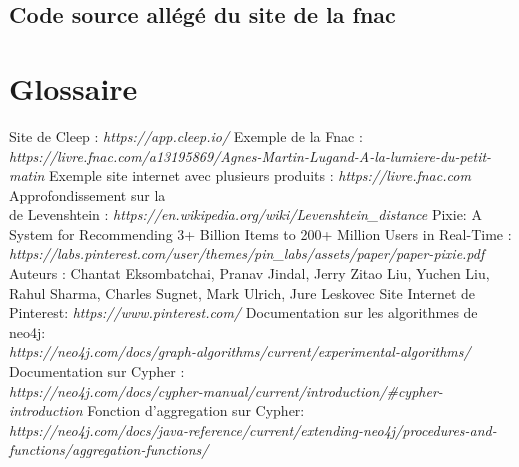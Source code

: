 \documentclass{article} %
\begin{document}
\subsection{Code source allégé du site de la fnac}
%

\newpage

\section{Glossaire}
\begin{thebibliography}{9}
	Site de Cleep : \textit{https://app.cleep.io/}
	Exemple de la Fnac : \textit{https://livre.fnac.com/a13195869/Agnes-Martin-Lugand-A-la-lumiere-du-petit-matin}
	Exemple site internet avec plusieurs produits : \textit{https://livre.fnac.com}
	Approfondissement sur la \\
	 de Levenshtein : \textit{https://en.wikipedia.org/wiki/Levenshtein\_distance}
	Pixie: A System for Recommending 3+ Billion Items to 200+ Million Users in Real-Time :
	\textit{https://labs.pinterest.com/user/themes/pin\_labs/assets/paper/paper-pixie.pdf}\\
	Auteurs : Chantat Eksombatchai, Pranav Jindal, Jerry Zitao Liu, Yuchen Liu,
	Rahul Sharma, Charles Sugnet, Mark Ulrich, Jure Leskovec
	Site Internet de Pinterest: \textit{https://www.pinterest.com/}
	Documentation sur les algorithmes de neo4j: \\ \textit{https://neo4j.com/docs/graph-algorithms/current/experimental-algorithms/}
	Documentation sur Cypher :\\
	\textit{https://neo4j.com/docs/cypher-manual/current/introduction/\#cypher-introduction}
	Fonction d'aggregation sur Cypher:\\
	\textit{https://neo4j.com/docs/java-reference/current/extending-neo4j/procedures-and-functions/aggregation-functions/}
	
\end{thebibliography}
\newpage






\imtaMakeCover
\end{document}

